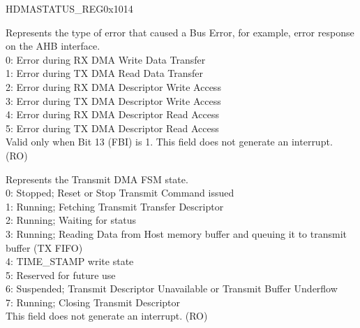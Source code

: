 \begin{register}{H}{DMASTATUS\_REG}{0x1014}
\begin{regdesc}
\begin{reglist}
\item [ERROR\_BITS] Represents the type of error that caused a Bus Error, for example, error response on the AHB interface.\\
0: Error during RX DMA Write Data Transfer\\
1: Error during TX DMA Read Data Transfer\\
2: Error during RX DMA Descriptor Write Access\\
3: Error during TX DMA Descriptor Write Access\\
4: Error during RX DMA Descriptor Read Access\\
5: Error during TX DMA Descriptor Read Access\\
Valid only when Bit 13 (FBI) is 1. This field does not generate an interrupt. (RO)
\item [TRANS\_PROC\_STATE] Represents the Transmit DMA FSM state.\\
0: Stopped; Reset or Stop Transmit Command issued\\
1: Running; Fetching Transmit Transfer Descriptor\\
2: Running; Waiting for status\\
3: Running; Reading Data from Host memory buffer and queuing it to transmit buffer (TX FIFO)\\
4: TIME\_STAMP write state\\
5: Reserved for future use\\
6: Suspended; Transmit Descriptor Unavailable or Transmit Buffer Underflow\\
7: Running; Closing Transmit Descriptor\\
This field does not generate an interrupt. (RO)
\item [Continued on the next page...]
\end{reglist}\end{regdesc}
\end{register}

